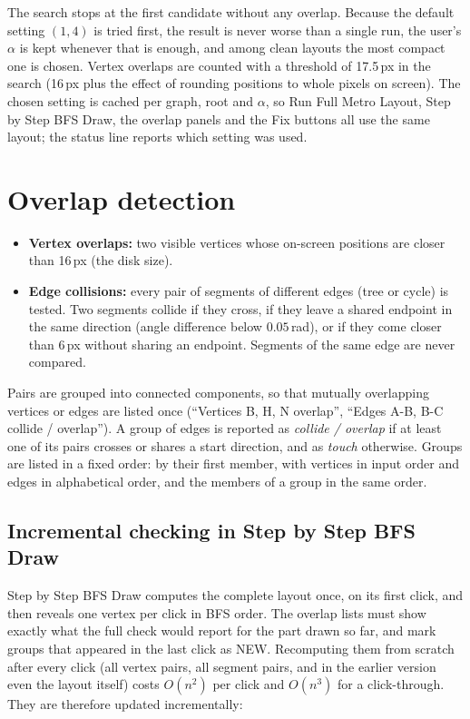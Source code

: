 \documentclass[11pt,a4paper]{article}
\begin{document}
The search stops at the first candidate without any overlap. Because the default setting $(1,4)$ is tried first, the result is never worse than a single run, the user's $\alpha$ is kept whenever that is enough, and among clean layouts the most compact one is chosen. Vertex overlaps are counted with a threshold of 17.5\,px in the search (16\,px plus the effect of rounding positions to whole pixels on screen). The chosen setting is cached per graph, root and $\alpha$, so Run Full Metro Layout, Step by Step BFS Draw, the overlap panels and the Fix buttons all use the same layout; the status line reports which setting was used.

\section{Overlap detection}
\label{sec:detect}

\begin{itemize}
  \item \textbf{Vertex overlaps:} two visible vertices whose on-screen positions are closer than 16\,px (the disk size).
  \item \textbf{Edge collisions:} every pair of segments of different edges (tree or cycle) is tested. Two segments collide if they cross, if they leave a shared endpoint in the same direction (angle difference below $0.05$\,rad), or if they come closer than 6\,px without sharing an endpoint. Segments of the same edge are never compared.
\end{itemize}
Pairs are grouped into connected components, so that mutually overlapping vertices or edges are listed once (``Vertices B, H, N overlap'', ``Edges A-B, B-C collide / overlap''). A group of edges is reported as \emph{collide / overlap} if at least one of its pairs crosses or shares a start direction, and as \emph{touch} otherwise. Groups are listed in a fixed order: by their first member, with vertices in input order and edges in alphabetical order, and the members of a group in the same order.

\subsection{Incremental checking in Step by Step BFS Draw}
\label{sec:incremental}

Step by Step BFS Draw computes the complete layout once, on its first click, and then reveals one vertex per click in BFS order. The overlap lists must show exactly what the full check would report for the part drawn so far, and mark groups that appeared in the last click as NEW. Recomputing them from scratch after every click (all vertex pairs, all segment pairs, and in the earlier version even the layout itself) costs $O(n^2)$ per click and $O(n^3)$ for a click-through. They are therefore updated incrementally:
\end{document}
